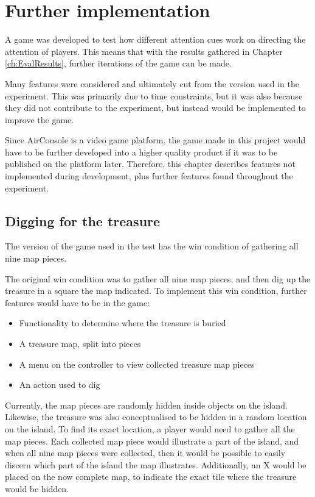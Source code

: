 \chapter{Further implementation}\label{ch:further_implementation}
A game was developed to test how different attention cues work on directing the attention of players. This means that with the results gathered in Chapter \ref{ch:EvalResults}, further iterations of the game can be made.

Many features were considered and ultimately cut from the version used in the experiment. This was primarily due to time constraints, but it was also because they did not contribute to the experiment, but instead would be implemented to improve the game.

Since AirConsole is a video game platform, the game made in this project would have to be further developed into a higher quality product if it was to be published on the platform later. Therefore, this chapter describes features not implemented during development, plus further features found throughout the experiment.

\section{Digging for the treasure}\label{sec:digging}
The version of the game used in the test has the win condition of gathering all nine map pieces. 

The original win condition was to gather all nine map pieces, and then dig up the treasure in a square the map indicated. To implement this win condition, further features would have to be in the game:
\begin{itemize}
\item Functionality to determine where the treasure is buried
\item A treasure map, split into pieces
\item A menu on the controller to view collected treasure map pieces
\item An action used to dig
\end{itemize}

Currently, the map pieces are randomly hidden inside objects on the island. Likewise, the treasure was also conceptualised to be hidden in a random location on the island. To find its exact location, a player would need to gather all the map pieces. Each collected map piece would illustrate a part of the island, and when all nine map pieces were collected, then it would be possible to easily discern which part of the island the map illustrates. Additionally, an X would be placed on the now complete map, to indicate the exact tile where the treasure would be hidden.


